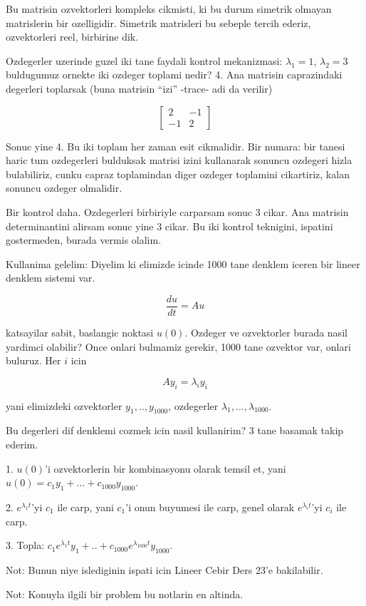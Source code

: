 \documentclass[12pt,fleqn]{article}
\begin{document}
Bu matrisin ozvektorleri kompleks cikmisti, ki bu durum simetrik olmayan
matrislerin bir ozelligidir. Simetrik matrisleri bu sebeple tercih ederiz,
ozvektorleri reel, birbirine dik.

Ozdegerler uzerinde guzel iki tane faydali kontrol mekanizmasi: $\lambda_1
= 1$, 
$\lambda_2 = 3$ buldugumuz ornekte iki ozdeger toplami nedir? 4. Ana
matrisin caprazindaki degerleri toplarsak (buna matrisin ``izi'' -trace-
adi da verilir)

\[ 
\left[\begin{array}{rr}
2 & -1 \\
-1 & 2
\end{array}\right]
 \]

Sonuc yine 4. Bu iki toplam her zaman esit cikmalidir. Bir numara: bir
tanesi haric tum ozdegerleri bulduksak matrisi izini kullanarak sonuncu
ozdegeri hizla bulabiliriz, cunku capraz toplamindan diger ozdeger
toplamini cikartiriz, kalan sonuncu ozdeger olmalidir.

Bir kontrol daha. Ozdegerleri birbiriyle carparsam sonuc 3 cikar. Ana
matrisin determinantini alirsam sonuc yine 3 cikar. Bu iki kontrol
teknigini, ispatini gostermeden, burada vermis olalim. 

Kullanima gelelim: Diyelim ki elimizde icinde 1000 tane denklem iceren bir
lineer denklem sistemi var. 

\[ \frac{du}{dt} = Au \]

katsayilar sabit, baslangic noktasi $u(0)$. Ozdeger ve ozvektorler burada
nasil yardimci olabilir? Once onlari bulmamiz gerekir, 1000 tane ozvektor
var, onlari buluruz. Her $i$ icin 

\[ Ay_i = \lambda_i y_i \]

yani elimizdeki ozvektorler $y_1,..,y_{1000}$, ozdegerler
$\lambda_1,...,\lambda_{1000}$. 

Bu degerleri dif denklemi cozmek icin nasil kullanirim? 3 tane basamak
takip ederim. 

1. $u(0)$'i ozvektorlerin bir kombinasyonu olarak temsil et, yani
 $u(0) =
c_1y_1 + ... + c_{1000}y_{1000}$. 

2. $e^{\lambda_1t}$'yi $c_1$ ile carp, yani $c_1$'i onun buyumesi ile
carp, genel olarak $e^{\lambda_it}$'yi $c_i$ ile carp. 

3. Topla: $c_1e^{\lambda_1t}y_1 + .. + c_{1000}e^{\lambda_{1000}
  t}y_{1000}$. 

Not: Bunun niye islediginin ispati icin Lineer Cebir Ders 23'e bakilabilir.

Not: Konuyla ilgili bir problem bu notlarin en altinda.
\end{document}
